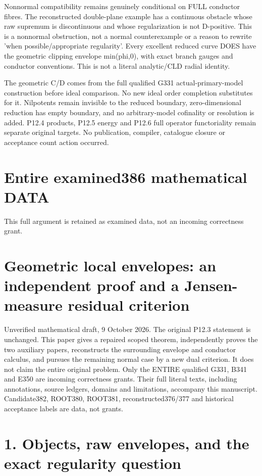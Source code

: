 \documentclass[11pt]{article}
\begin{document}
Nonnormal compatibility remains genuinely conditional on FULL conductor fibres. The reconstructed double-plane example has a continuous obstacle whose raw supremum is discontinuous and whose regularization is not D-positive. This is a nonnormal obstruction, not a normal counterexample or a reason to rewrite 'when possible/appropriate regularity'. Every excellent reduced curve DOES have the geometric clipping envelope min(phi,0), with exact branch gauges and conductor conventions. This is not a literal analytic/CLD radial identity.

The geometric C/D comes from the full qualified G331 actual-primary-model construction before ideal comparison. No new ideal order completion substitutes for it. Nilpotents remain invisible to the reduced boundary, zero-dimensional reduction has empty boundary, and no arbitrary-model cofinality or resolution is added. P12.4 products, P12.5 energy and P12.6 full operator functoriality remain separate original targets. No publication, compiler, catalogue closure or acceptance count action occurred.

\appendix
\section{Entire examined386 mathematical DATA}
This full argument is retained as examined data, not an incoming correctness grant.
\section{Geometric local envelopes: an independent proof and a Jensen-measure residual criterion}

Unverified mathematical draft, 9 October 2026. The original P12.3 statement is unchanged. This paper gives a repaired scoped theorem, independently proves the two auxiliary papers, reconstructs the surrounding envelope and conductor calculus, and pursues the remaining normal case by a new dual criterion. It does not claim the entire original problem. Only the ENTIRE qualified G331, B341 and E350 are incoming correctness grants. Their full literal texts, including annotations, source ledgers, domains and limitations, accompany this manuscript. Candidate382, ROOT380, ROOT381, reconstructed376/377 and historical acceptance labels are data, not grants.

\section{1. Objects, raw envelopes, and the exact regularity question}
\end{document}
